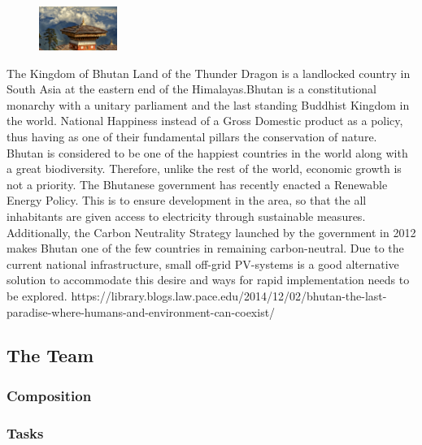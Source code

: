 \documentclass{article}
\begin{document}
\begin{figure}
    \includegraphics[width=1in]{picture/bhutan}
\end{figure}

The Kingdom of Bhutan \og Land of the Thunder Dragon\fg{} is a landlocked country in South Asia at the eastern end of the Himalayas.Bhutan is a constitutional monarchy with a unitary parliament and the last standing Buddhist Kingdom in the world.
National Happiness instead of a Gross Domestic product as a policy, thus having as one of their fundamental pillars the conservation of nature. Bhutan is considered to be one of the happiest countries in the world along with a great biodiversity. Therefore, unlike the rest of the world, economic growth is not a priority.
The Bhutanese government has recently enacted a Renewable Energy Policy. This is to ensure development in the area, so that the all inhabitants are given access to electricity through sustainable measures.  Additionally, the Carbon Neutrality Strategy launched by the government in 2012 makes Bhutan one of the few countries in remaining carbon-neutral. 
Due to the current national infrastructure, small off-grid PV-systems is a good alternative solution to accommodate this desire and ways for rapid implementation needs to be explored.
https://library.blogs.law.pace.edu/2014/12/02/bhutan-the-last-paradise-where-humans-and-environment-can-coexist/

\subsection{The Team}


\subsubsection{Composition}


\subsubsection{Tasks}
\end{document}
